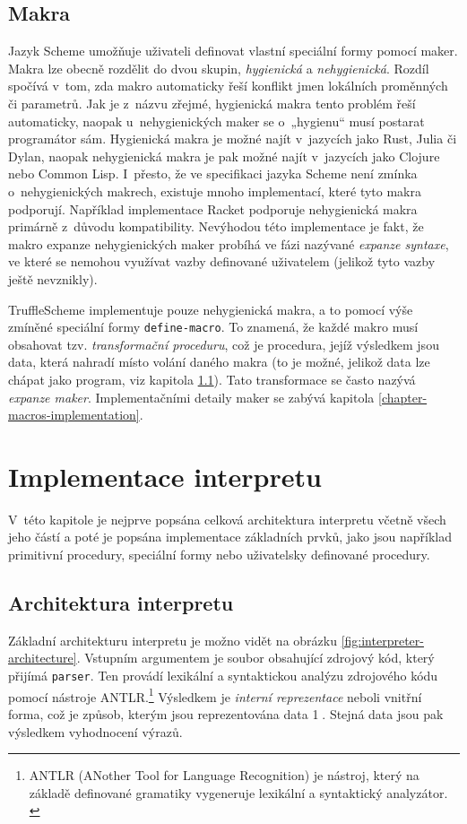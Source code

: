 \documentclass[
  master,
  biblatex,
  figures=true,
  theorems,
  sourcecodes,
  glossaries,
  index
]{kidiplom}
\begin{document}
\subsection{Makra} 
\label{chapter-macros}
Jazyk Scheme umožňuje uživateli definovat vlastní speciální formy pomocí maker. Makra lze obecně rozdělit do dvou skupin, \textit{hygienická} a \textit{nehygienická}. Rozdíl spočívá v~tom, zda makro automaticky řeší konflikt jmen lokálních proměnných či parametrů. Jak je z~názvu zřejmé, hygienická makra tento problém řeší automaticky, naopak u~nehygienických maker se o~„hygienu“ musí postarat programátor sám. Hygienická makra je možné najít v~jazycích jako Rust, Julia či Dylan, naopak nehygienická makra je pak možné najít v~jazycích jako Clojure nebo Common Lisp. I~přesto, že ve specifikaci jazyka Scheme není zmínka o~nehygienických makrech, existuje mnoho implementací, které tyto makra podporují. Například implementace Racket podporuje nehygienická makra primárně z~důvodu kompatibility. Nevýhodou této implementace je fakt, že makro expanze nehygienických maker probíhá ve fázi nazývané \textit{expanze syntaxe}, ve které se nemohou využívat vazby definované uživatelem (jelikož tyto vazby ještě nevznikly). \cite{legacy-macro-support}

TruffleScheme implementuje pouze nehygienická makra, a to pomocí výše zmíněné speciální formy \texttt{define-macro}. To znamená, že každé makro musí obsahovat tzv. \textit{transformační proceduru}, což je procedura, jejíž výsledkem jsou data, která nahradí místo volání daného makra (to je možné, jelikož data lze chápat jako program, viz kapitola \ref{chapter-architecture-of-interpreter}). Tato transformace se často nazývá \textit{expanze maker}. Implementačními detaily maker se zabývá kapitola \ref{chapter-macros-implementation}.


\newpage
\section{Implementace interpretu}
V~této kapitole je nejprve popsána celková architektura interpretu včetně všech jeho částí a poté je popsána implementace základních prvků, jako jsou například primitivní procedury, speciální formy nebo uživatelsky definované procedury.  


\subsection{Architektura interpretu}
\label{chapter-architecture-of-interpreter}
Základní architekturu interpretu je možno vidět na obrázku \ref{fig:interpreter-architecture}. Vstupním argumentem je soubor obsahující zdrojový kód, který přijímá \texttt{parser}. Ten provádí lexikální a syntaktickou analýzu zdrojového kódu pomocí nástroje ANTLR.\footnote{ANTLR (ANother Tool for Language Recognition) je nástroj, který na základě definované gramatiky vygeneruje lexikální a syntaktický analyzátor. \cite{antlr}} Výsledkem je \textit{interní reprezentace} neboli vnitřní forma, což je způsob, kterým jsou reprezentována data {\Large \textcircled{\normalsize 1}}. Stejná data jsou pak výsledkem vyhodnocení výrazů.
\end{document}
